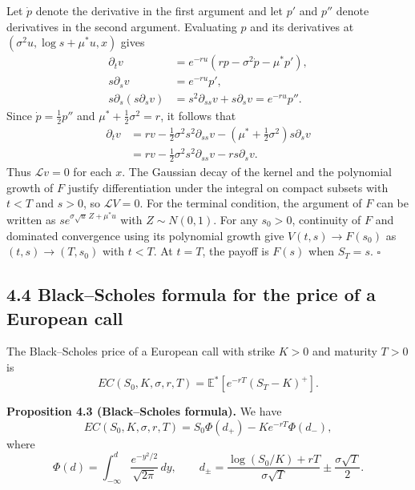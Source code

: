 \documentclass[11pt,a4paper]{article}
\begin{document}
Let $\dot p$ denote the derivative in the first argument and let $p'$
and $p''$ denote derivatives in the second argument. Evaluating $p$
and its derivatives at $(\sigma^2u,\log s+\mu^*u,x)$ gives
\[
\begin{aligned}
\partial_t v &= e^{-ru}(rp-\sigma^2\dot p-\mu^*p'),\\
s\partial_s v &= e^{-ru}p',\\
s\partial_s(s\partial_s v)
&=s^2\partial_{ss}v+s\partial_s v=e^{-ru}p''.
\end{aligned}
\]
Since $\dot p=\frac12 p''$ and $\mu^*+\frac12\sigma^2=r$, it follows that
\[
\begin{aligned}
\partial_t v
&=rv-\tfrac12\sigma^2s^2\partial_{ss}v
  -\left(\mu^*+\tfrac12\sigma^2\right)s\partial_s v\\
&=rv-\tfrac12\sigma^2s^2\partial_{ss}v-rs\partial_s v.
\end{aligned}
\]
Thus $\mathcal Lv=0$ for each $x$. The Gaussian decay of the kernel
and the polynomial growth of $F$ justify differentiation under the
integral on compact subsets with $t<T$ and $s>0$, so $\mathcal LV=0$.
For the terminal condition, the argument of $F$ can be written as
$se^{\sigma\sqrt u\,Z+\mu^*u}$ with $Z\sim N(0,1)$. For any $s_0>0$,
continuity of $F$ and dominated convergence using its polynomial growth
give $V(t,s)\to F(s_0)$ as $(t,s)\to(T,s_0)$ with $t<T$.
At $t=T$, the payoff is $F(s)$ when $S_T=s$. \hfill$\square$

\subsection*{4.4 Black--Scholes formula for the price of a European call}

The Black--Scholes price of a European call with strike $K>0$ and
maturity $T>0$ is
\[
EC(S_0,K,\sigma,r,T)=\mathbb E^*[e^{-rT}(S_T-K)^+].
\]

\noindent\textbf{Proposition 4.3 (Black--Scholes formula).}
We have
\[
EC(S_0,K,\sigma,r,T)=S_0\Phi(d_+)-Ke^{-rT}\Phi(d_-),
\]
where
\[
\Phi(d)=\int_{-\infty}^d\frac{e^{-y^2/2}}{\sqrt{2\pi}}\,dy,
\qquad
d_\pm=\frac{\log(S_0/K)+rT}{\sigma\sqrt T}\pm\frac{\sigma\sqrt T}{2}.
\]
\end{document}
